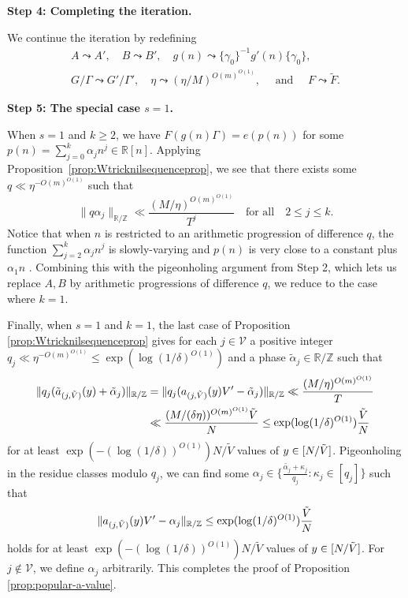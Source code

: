 \documentclass[11pt]{amsart}
\theoremstyle{definition}
\newcommand{\R}{{\mathbb R}}
\newcommand{\Z}{{\mathbb Z}}
\newcommand{\CV}{{\mathcal V}}
\begin{document}
\smallskip
\textbf{Step 4: Completing the iteration.}
\smallskip

We continue the iteration by redefining 
\begin{gather*}
A \leadsto A',\quad B \leadsto B',\quad g(n) \leadsto \{\gamma_0\}^{-1}g'(n)\{\gamma_0\},\\ G/\Gamma \leadsto G'/\Gamma',\quad \eta \leadsto (\eta/M)^{O(m)^{O(1)}},\quad \text{ and }\quad F \leadsto \tilde{F}.    
\end{gather*}


\smallskip
\textbf{Step 5: The special case $s = 1$.}
\smallskip

When $s = 1$ and $k \ge 2$, we have $F(g(n)\Gamma) = e(p(n))$ for some $p(n) = \sum_{j = 0}^k \alpha_j n^j \in \mathbb{R}[n]$. Applying Proposition~\ref{prop:Wtricknilsequenceprop}, we see that there exists some $q \ll \eta^{-O(m)^{O(1)}}$ such that
$$\|q\alpha_j\|_{\mathbb{R}/\mathbb{Z}} \ll \frac{(M/\eta)^{O(m)^{O(1)}}}{T^j}\quad \textrm{for all}\quad 2\leq j \leq k.$$
Notice that when $n$ is restricted to an arithmetic progression of difference $q$, the function $\sum_{j=2}^k \alpha_j n^j$ is slowly-varying and $p(n)$ is very close to a constant plus $\alpha_1 n$ .  Combining this with the pigeonholing argument from Step 2, which lets us replace $A,B$ by arithmetic progressions of difference $q$, we reduce to the case where $k=1$.

Finally, when $s = 1$ and $k = 1$, the last case of Proposition \ref{prop:Wtricknilsequenceprop} gives for each $j\in\CV$ a positive integer $q_j\ll \eta^{-O(m)^{O(1)}}\leq \exp(\log(1/\delta)^{O(1)})$ and a phase $\tilde{\alpha}_j\in\R/\Z$ such that
\begin{align*}
    \|q_j(\tilde{a}_{(j, \tilde{V})}(y) + \tilde{\alpha}_j)\|_{\mathbb{R}/\mathbb{Z}} &= \|q_j({a}_{(j, \tilde{V})}(y)V' - \tilde{\alpha}_j)\|_{\mathbb{R}/\mathbb{Z}}\ll \frac{(M/\eta)^{O(m)^{O(1)}}}{T}\\
    &\ll \frac{(M/(\delta\eta))^{O(m)^{O(1)}}\tilde{V}}{N}\leq \exp(\log(1/\delta)^{O(1)})\frac{\Tilde{V}}{N} 
\end{align*}
for at least $\exp(-(\log(1/\delta))^{O(1)})N/\tilde{V}$ values of $y\in [N/\Tilde{V}]$. Pigeonholing in the residue classes modulo $q_j$, we can find some $\alpha_j \in \{\frac{\tilde{\alpha_j}+\kappa_j}{q_j}: \kappa_j \in [q_j]\}$ such that
\begin{align*}
    \|{a}_{(j, \tilde{V})}(y)V' - {\alpha}_j\|_{\mathbb{R}/\mathbb{Z}}\leq \exp(\log(1/\delta)^{O(1)})\frac{\Tilde{V}}{N} 
\end{align*}
holds for at least $\exp(-(\log(1/\delta))^{O(1)})N/\tilde{V}$ values of $y\in [N/\Tilde{V}]$.
For $j\notin\CV$, we define $\alpha_j$ arbitrarily. This completes the proof of Proposition \ref{prop:popular-a-value}.
\end{document}
